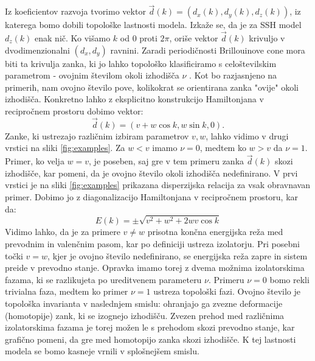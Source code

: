 Iz koeficientov razvoja tvorimo vektor $\vec{d}(k) = (d_x (k), d_y (k) ,d_z (k) )$, iz katerega bomo dobili topološke lastnosti modela. Izkaže se, da je za SSH model $d_z(k)$ enak nič. Ko višamo $k$ od $0$ proti $2 \pi$, oriše vektor $\vec{d}(k)$ krivuljo v dvodimenzionalni $(d_x,d_y)$ ravnini. Zaradi periodičnosti Brillouinove cone mora biti ta krivulja  zanka, ki jo lahko topološko klasificiramo s celoštevilskim parametrom - ovojnim številom okoli izhodišča $\nu$ \cite{hatcher}. Kot bo razjasnjeno na primerih, nam ovojno število pove, kolikokrat se orientirana zanka "ovije"  okoli izhodišča.
Konkretno lahko z eksplicitno konstrukcijo Hamiltonjana v recipročnem prostoru dobimo vektor:
\begin{equation}
\vec{d}(k) = (v + w \cos k, w \sin k, 0).
\end{equation}
Zanke, ki ustrezajo različnim izbiram parametrov $v, w$, lahko vidimo v drugi vrstici na sliki \ref{fig:examples}. Za $w < v$ imamo $\nu = 0$, medtem ko $w > v$ da $\nu=1$. Primer, ko velja $w=v$, je poseben, saj gre v tem primeru zanka $\vec{d}(k)$ skozi izhodišče, kar pomeni, da je ovojno število okoli izhodišča nedefinirano.
V prvi vrstici je na sliki \ref{fig:examples} prikazana disperzijska relacija za vsak obravnavan primer. Dobimo jo z diagonalizacijo Hamiltonjana v recipročnem prostoru, kar da:
\begin{equation}
E(k) = \pm \sqrt{v^2 + w^2 + 2 w v \cos k}
\end{equation}
Vidimo lahko, da je za primere $v \neq w$ prisotna končna energijska reža med prevodnim in valenčnim pasom, kar po definiciji ustreza izolatorju. Pri posebni točki $v=w$, kjer je ovojno število nedefinirano, se energijska reža zapre in sistem preide v prevodno stanje. Opravka imamo torej z dvema možnima izolatorskima fazama, ki se razlikujeta po ureditvenem parameteru $\nu$. Primeru $\nu=0$ bomo rekli trivialna faza, medtem ko primer $\nu=1$ ustreza topološki fazi. Ovojno število je topološka invarianta v naslednjem smislu: ohranjajo ga zvezne deformacije (homotopije) zank, ki se izognejo izhodišču. Zvezen prehod med različnima izolatorskima fazama je torej možen le s prehodom skozi prevodno stanje, kar grafično pomeni, da gre med homotopijo zanka skozi izhodišče. K tej lastnosti modela se bomo kasneje vrnili v splošnejšem smislu.
